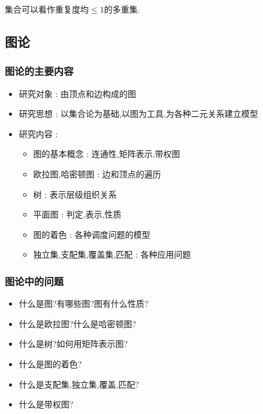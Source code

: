 \documentclass[UTF8,12pt]{ctexbook}
\begin{document}
{{{{{  集合可以看作重复度均$\leq 1$的多重集.
}%

}%

\subsection{图论}{

  \subsubsection{图论的主要内容}{
    \begin{itemize}
      \item 研究对象 : 由顶点和边构成的图
      \item 研究思想 : 以集合论为基础,以图为工具,为各种二元关系建立模型
      \item 研究内容 : \begin{itemize}
              \item 图的基本概念 : 连通性,矩阵表示,带权图
              \item 欧拉图,哈密顿图 : 边和顶点的遍历
              \item 树 : 表示层级组织关系
              \item 平面图 : 判定,表示,性质
              \item 图的着色 : 各种调度问题的模型
              \item 独立集,支配集,覆盖集,匹配 : 各种应用问题
            \end{itemize}
    \end{itemize}
  }%

  \subsubsection{图论中的问题}{
    \begin{itemize}
      \item 什么是图?有哪些图?图有什么性质?
      \item 什么是欧拉图?什么是哈密顿图?
      \item 什么是树?如何用矩阵表示图?
      \item 什么是图的着色?
      \item 什么是支配集,独立集,覆盖,匹配?
      \item 什么是带权图?
    \end{itemize}
  }%

}%

}%

}}
\end{document}
